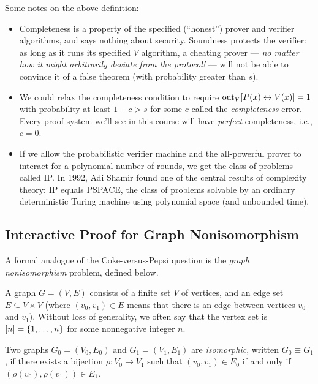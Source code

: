 \documentclass[11pt]{article}
\begin{document}
\begin{remark}
  \label{rem:ips}
  Some notes on the above definition:
  \begin{itemize}
  \item Completeness is a property of the specified (``honest'')
    prover and verifier algorithms, and says nothing about security.
    Soundness protects the verifier: as long as it runs its specified
    $V$ algorithm, a cheating prover --- \emph{no matter how it might
      arbitrarily deviate from the protocol!} --- will not be able to
    convince it of a false theorem (with probability greater than
    $s$).
  \item We could relax the completeness condition to require
    $\text{out}_{V}[ P(x) \leftrightarrow V(x) ] = 1$ with probability at
    least $1-c > s$ for some $c$ called the \emph{completeness} error.
    Every proof system we'll see in this course will have
    \emph{perfect} completeness, i.e., $c=0$.
  \item If we allow the probabilistic verifier machine and the
    all-powerful prover to interact for a polynomial number of rounds,
    we get the class of problems called IP.  In 1992, Adi Shamir found
    one of the central results of complexity theory: IP equals PSPACE,
    the class of problems solvable by an ordinary deterministic Turing
    machine using polynomial space (and unbounded time).
  \end{itemize}
\end{remark}

\subsection{Interactive Proof for Graph Nonisomorphism}
\label{sec:inter-proof-graph}

A formal analogue of the Coke-versus-Pepsi question is the \emph{graph
nonisomorphism} problem, defined below.

\newcommand{\gni}{\problem{GNI}}

A graph $G = (V,E)$ consists of a finite set $V$ of vertices, and an
edge set $E \subseteq V \times V$ (where $(v_{0}, v_{1}) \in E$ means
that there is an edge between vertices $v_{0}$ and $v_{1}$).  Without
loss of generality, we often say that the vertex set is $[n] = \{1,
\ldots, n\}$ for some nonnegative integer $n$.

\begin{definition}
  Two graphs $G_{0} = (V_{0}, E_{0})$ and $G_{1} = (V_{1}, E_{1})$ are
  \emph{isomorphic}, written $G_{0} \equiv G_{1}$, if there exists a
  bijection $\rho \colon V_{0} \to V_{1}$ such that $(v_{0}, v_{1})
  \in E_{0}$ if and only if $(\rho(v_{0}), \rho(v_{1})) \in E_{1}$.
\end{definition}
\end{document}
